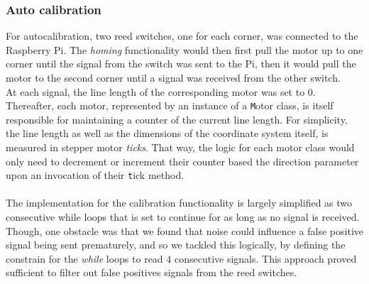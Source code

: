 \subsubsection{Auto calibration}
For autocalibration, two reed switches, one for each corner, was connected to the Raspberry Pi. The {\it homing} functionality would then first pull the motor up to one corner until the signal from the switch was sent to the Pi, then it would pull the motor to the second corner until a signal was received from the other switch. \\
At each signal, the line length of the corresponding motor was set to $0$. Thereafter, each motor, represented by an instance of a {\texttt Motor} class, is itself responsible for maintaining a counter of the current line length. For simplicity, the line length as well as the dimensions of the coordinate system itself, is measured in stepper motor {\it ticks}. That way, the logic for each motor class would only need to decrement or increment their counter based the direction parameter upon an invocation of their {\texttt tick} method.
\\\\
The implementation for the calibration functionality is largely simplified as two consecutive while loops that is set to continue for as long as no signal is received. Though, one obstacle was that we found that noise could influence a false positive signal being sent prematurely, and so we tackled this logically, by defining the constrain for the {\it while} loops to read $4$ consecutive signals. This approach proved sufficient to filter out false positives signals from the reed switches. 

